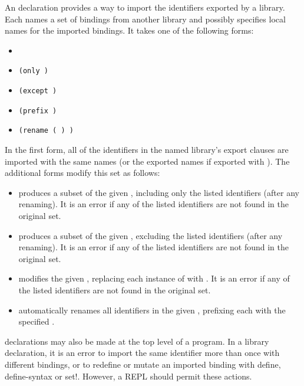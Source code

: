 An  declaration provides a way to import the identifiers
exported by a library.  Each  names a set of bindings
from another library and possibly specifies local names for the
imported bindings. It takes one of the following forms:

\begin{itemize}
\item {\tt{}}
\item {\tt(only   \dotsfoo)}
\item {\tt(except   \dotsfoo)}
\item {\tt(prefix  )}
\item {\tt(rename  ( ) \dotsfoo)}
\end{itemize}

In the first form, all of the identifiers in the named library's export
clauses are imported with the same names (or the exported names if
exported with ).  The additional 
forms modify this set as follows:

\begin{itemize}

\item {} produces a subset of the given
  , including only the listed identifiers (after any
  renaming).  It is an error if any of the listed identifiers are
  not found in the original set.

\item {} produces a subset of the given
  , excluding the listed identifiers (after any
  renaming). It is an error if any of the listed identifiers are not
  found in the original set.

\item {} modifies the given ,
  replacing each instance of  with
  . It is an error if any of the listed
  identifiers are not found in the original set.

\item {} automatically renames all identifiers in
  the given , prefixing each with the specified
  .

\end{itemize}

 declarations may also be made at the top level of a
program.  In a library declaration, it is an error to import the same
identifier more than once with different bindings, or to redefine or
mutate an imported binding with {\cf define}, {\cf define-syntax}
or {\cf set!}.  However, a REPL should permit these actions.

